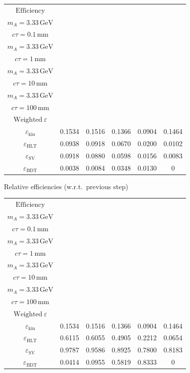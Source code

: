 \documentclass[10pt,a4paper]{article}
\begin{document}
{\begin{tabular}{cccccc}
\toprule
$\mathrm{Efficiency}$ & \shortstack{$m_{\pi}=10\,\mathrm{GeV}$\\$m_{A}=3.33\,\mathrm{GeV}$\\$c\tau=0.1\,\mathrm{mm}$} & \shortstack{$m_{\pi}=10\,\mathrm{GeV}$\\$m_{A}=3.33\,\mathrm{GeV}$\\$c\tau=1\,\mathrm{mm}$} & \shortstack{$m_{\pi}=10\,\mathrm{GeV}$\\$m_{A}=3.33\,\mathrm{GeV}$\\$c\tau=10\,\mathrm{mm}$} & \shortstack{$m_{\pi}=10\,\mathrm{GeV}$\\$m_{A}=3.33\,\mathrm{GeV}$\\$c\tau=100\,\mathrm{mm}$} & \shortstack{$\mathrm{QCD}$\\$\mathrm{Weighted}\ \varepsilon$} \\
\midrule
$\varepsilon_{\mathrm{kin}}$ & 0.1534 & 0.1516 & 0.1366 & 0.0904 & 0.1464\\
$\varepsilon_{\mathrm{HLT}}$ & 0.0938 & 0.0918 & 0.0670 & 0.0200 & 0.0102\\
$\varepsilon_{\mathrm{SV}}$ & 0.0918 & 0.0880 & 0.0598 & 0.0156 & 0.0083\\
$\varepsilon_{\mathrm{BDT}}$ & 0.0038 & 0.0084 & 0.0348 & 0.0130 & $0$\\
\bottomrule
\end{tabular}

\vspace{18pt}

Relative efficiencies (w.r.t.\ previous step)

\begin{tabular}{cccccc}
\toprule
$\mathrm{Efficiency}$ & \shortstack{$m_{\pi}=10\,\mathrm{GeV}$\\$m_{A}=3.33\,\mathrm{GeV}$\\$c\tau=0.1\,\mathrm{mm}$} & \shortstack{$m_{\pi}=10\,\mathrm{GeV}$\\$m_{A}=3.33\,\mathrm{GeV}$\\$c\tau=1\,\mathrm{mm}$} & \shortstack{$m_{\pi}=10\,\mathrm{GeV}$\\$m_{A}=3.33\,\mathrm{GeV}$\\$c\tau=10\,\mathrm{mm}$} & \shortstack{$m_{\pi}=10\,\mathrm{GeV}$\\$m_{A}=3.33\,\mathrm{GeV}$\\$c\tau=100\,\mathrm{mm}$} & \shortstack{$\mathrm{QCD}$\\$\mathrm{Weighted}\ \varepsilon$} \\
\midrule
$\varepsilon_{\mathrm{kin}}$ & 0.1534 & 0.1516 & 0.1366 & 0.0904 & 0.1464\\
$\varepsilon_{\mathrm{HLT}}$ & 0.6115 & 0.6055 & 0.4905 & 0.2212 & 0.0654\\
$\varepsilon_{\mathrm{SV}}$ & 0.9787 & 0.9586 & 0.8925 & 0.7800 & 0.8183\\
$\varepsilon_{\mathrm{BDT}}$ & 0.0414 & 0.0955 & 0.5819 & 0.8333 & $0$\\
\bottomrule
\end{tabular}

}
\end{document}
